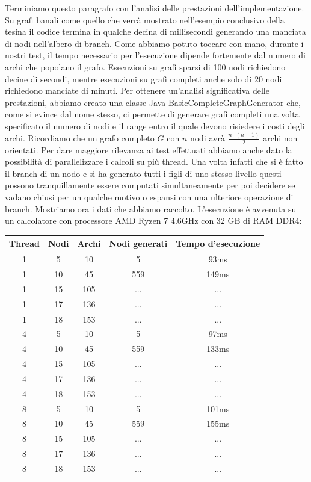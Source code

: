 \documentclass[
	article,			%
	12pt,				%
	oneside,			%
	a4paper,			%
	english,			%
	italian,				%
	sumario=tradicional,
	]{abntex2}
\begin{document}
Terminiamo questo paragrafo con l'analisi delle prestazioni dell'implementazione. Su grafi banali come quello che verrà mostrato nell'esempio conclusivo della tesina il codice termina in qualche decina di millisecondi generando una manciata di nodi nell'albero di branch. Come abbiamo potuto toccare con mano, durante i nostri test, il tempo necessario per l'esecuzione dipende fortemente dal numero di archi che popolano il grafo. Esecuzioni su grafi sparsi di 100 nodi richiedono decine di secondi, mentre esecuzioni su grafi completi anche solo di 20 nodi richiedono manciate di minuti. Per ottenere un'analisi significativa delle prestazioni, abbiamo creato una classe Java {\selectfont BasicCompleteGraphGenerator} che, come si evince dal nome stesso, ci permette di generare grafi completi una volta specificato il numero di nodi e il range entro il quale devono risiedere i costi degli archi. Ricordiamo che un grafo completo $G$ con $n$ nodi avrà $\frac{n\cdot (n-1)}{2}$ archi non orientati. Per dare maggiore rilevanza ai test effettuati abbiamo anche dato la possibilità di parallelizzare i calcoli su più thread. Una volta infatti che si è fatto il branch di un nodo e si ha generato tutti i figli di uno stesso livello questi possono tranquillamente essere computati simultaneamente per poi decidere se vadano chiusi per un qualche motivo o espansi con una ulteriore operazione di branch.
\newline
Mostriamo ora i dati che abbiamo raccolto. L'esecuzione è avvenuta su un calcolatore con processore AMD Ryzen 7 4.6GHz con 32 GB di RAM DDR4:
\begin{center}
 \begin{tabular}{||c c c c c||} 
 \hline
 Thread & Nodi & Archi & Nodi generati & Tempo d'esecuzione\\ [0.5ex] 
 \hline\hline
 1 & 5 & 10 & 5 & 93ms\\ 
 \hline
 1 & 10 & 45 & 559 & 149ms\\
 \hline
 1 & 15 & 105 & ... & ...\\
 \hline
 1 & 17 & 136 & ... & ...\\
 \hline
 1 & 18 & 153 & ... & ...\\
 \hline
 \hline
 4 & 5 & 10 & 5 & 97ms\\ 
 \hline
 4 & 10 & 45 & 559 & 133ms\\
 \hline
 4 & 15 & 105 & ... & ...\\
 \hline
 4 & 17 & 136 & ... & ...\\
 \hline
 4 & 18 & 153 & ... & ...\\
 \hline
 \hline
 8 & 5 & 10 & 5 & 101ms\\ 
 \hline
 8 & 10 & 45 & 559 & 155ms\\
 \hline
 8 & 15 & 105 & ... & ...\\
 \hline
 8 & 17 & 136 & ... & ...\\
 \hline
 8 & 18 & 153 & ... & ...\\
 \hline
\end{tabular}
\end{center}
\end{document}
